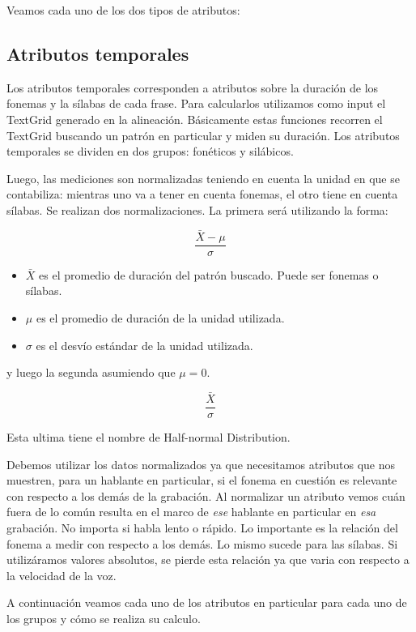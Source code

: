 Veamos cada uno de los dos tipos de atributos:

\subsection{Atributos temporales}

Los atributos temporales corresponden a atributos sobre la duración de los fonemas y la sílabas de cada frase. Para calcularlos utilizamos como input el TextGrid generado en la alineación. Básicamente estas funciones recorren el TextGrid buscando un patrón en particular y miden su duración. Los atributos temporales se dividen en dos grupos: fonéticos y silábicos. 

Luego, las mediciones son normalizadas teniendo en cuenta la unidad en que se contabiliza: mientras uno va a tener en cuenta fonemas, el otro tiene en cuenta sílabas. Se realizan dos normalizaciones. La primera será utilizando la forma:

\hspace{2cm} \[\frac{ \bar{X} - \mu }{ \sigma }\]

\begin{itemize}
	\item $\bar{X}$ es el promedio de duración del patrón buscado. Puede ser fonemas o sílabas.
	\item $\mu$ es el promedio de duración de la unidad utilizada.
	\item $\sigma$ es el desvío estándar de la unidad utilizada.
\end{itemize}

y luego la segunda asumiendo que $\mu = 0$. 

\hspace{2cm} \[\frac{ \bar{X} }{ \sigma }\]

Esta ultima tiene el nombre de Half-normal Distribution.

Debemos utilizar los datos normalizados ya que necesitamos atributos que nos muestren, para un hablante en particular, si el fonema en cuestión es relevante con respecto a los demás de la grabación. Al normalizar un atributo vemos cuán fuera de lo común resulta en el marco de \textit{ese} hablante en particular en \textit{esa} grabación. No importa si habla lento o rápido. Lo importante es la relación del fonema a medir con respecto a los demás. Lo mismo sucede para las sílabas. Si utilizáramos valores absolutos, se pierde esta relación ya que varia con respecto a la velocidad de la voz.
 
A continuación veamos cada uno de los atributos en particular para cada uno de los grupos y cómo se realiza su calculo. 

